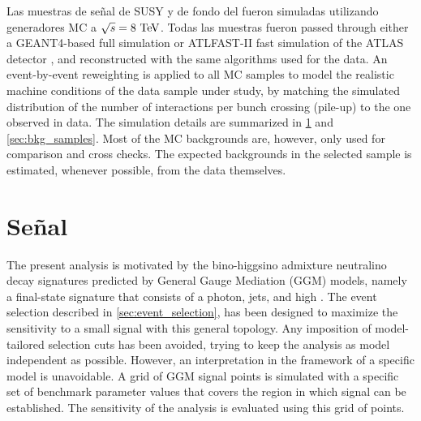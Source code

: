 Las muestras de se\~nal de SUSY y de fondo del {\SM} fueron simuladas utilizando generadores MC
a $\sqrt{s}=8\tev$.
Todas las muestras fueron passed through either a GEANT4-based full simulation \cite{Geant4,AtlasSim}
or ATLFAST-II fast simulation \cite{Richter-Was:683751} of the ATLAS detector \cite{Geant4,AtlasSim},
and reconstructed with the same algorithms used for the data. An event-by-event reweighting is
applied to all MC samples to model the realistic machine conditions of the data sample
under study, by matching the simulated distribution of the number of interactions per bunch
crossing (pile-up) to the one observed in data.
The simulation details are summarized in {\Sec} \ref{sec:sig_samples} and \ref{sec:bkg_samples}.
Most of the MC backgrounds are, however, only used for comparison and cross checks.
The expected backgrounds in the selected sample is estimated, whenever possible,
from the data themselves. %

\section{Se\~nal}\label{sec:sig_samples}

The present analysis is motivated by the bino-higgsino admixture neutralino decay signatures predicted by General Gauge Mediation (GGM) models,
namely a final-state signature that consists of a photon, jets, and high \MET. The event selection described in {\Sec} \ref{sec:event_selection},
has been designed to maximize the sensitivity to a small signal with this general topology. Any imposition of model-tailored selection cuts has been
avoided, trying to keep the analysis as model independent as possible. However, an interpretation in the framework of a specific model is unavoidable.
A grid of GGM signal points is simulated with a specific set of benchmark parameter values that covers the region in which signal can be established.
The sensitivity of the analysis is evaluated using this grid of points.

